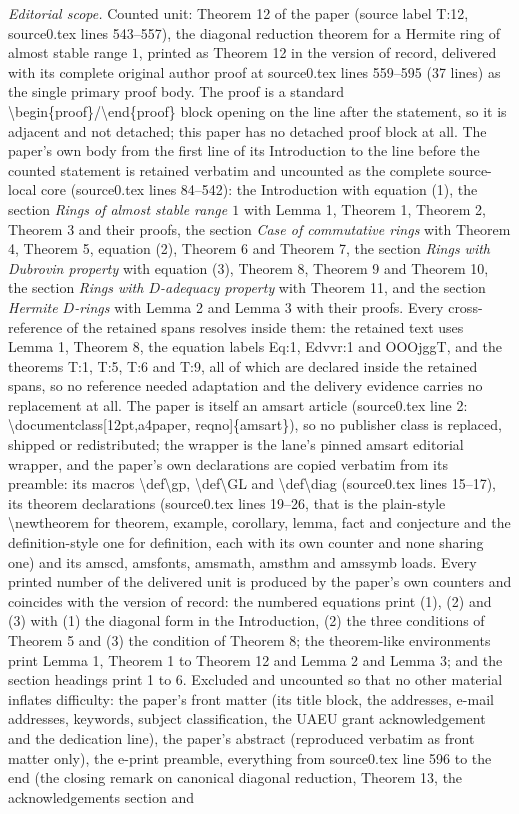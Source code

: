 \documentclass[10pt,a4paper]{amsart}
\theoremstyle{plain}
\theoremstyle{definition}
\begin{document}
\noindent\textit{Editorial scope.} Counted unit: Theorem 12 of the paper (source label T:12, source0.tex lines 543--557), the diagonal reduction theorem for a Hermite ring of almost stable range $1$, printed as Theorem 12 in the version of record, delivered with its complete original author proof at source0.tex lines 559--595 (37 lines) as the single primary proof body. The proof is a standard \textbackslash{}begin\{proof\}/\textbackslash{}end\{proof\} block opening on the line after the statement, so it is adjacent and not detached; this paper has no detached proof block at all. The paper's own body from the first line of its Introduction to the line before the counted statement is retained verbatim and uncounted as the complete source-local core (source0.tex lines 84--542): the Introduction with equation (1), the section \emph{Rings of almost stable range $1$} with Lemma 1, Theorem 1, Theorem 2, Theorem 3 and their proofs, the section \emph{Case of commutative rings} with Theorem 4, Theorem 5, equation (2), Theorem 6 and Theorem 7, the section \emph{Rings with Dubrovin property} with equation (3), Theorem 8, Theorem 9 and Theorem 10, the section \emph{Rings with $D$-adequacy property} with Theorem 11, and the section \emph{Hermite $D$-rings} with Lemma 2 and Lemma 3 with their proofs. Every cross-reference of the retained spans resolves inside them: the retained text uses Lemma 1, Theorem 8, the equation labels Eq:1, Edvvr:1 and OOOjggT, and the theorems T:1, T:5, T:6 and T:9, all of which are declared inside the retained spans, so no reference needed adaptation and the delivery evidence carries no replacement at all. The paper is itself an amsart article (source0.tex line 2: \textbackslash{}documentclass[12pt,a4paper, reqno]\{amsart\}), so no publisher class is replaced, shipped or redistributed; the wrapper is the lane's pinned amsart editorial wrapper, and the paper's own declarations are copied verbatim from its preamble: its macros \textbackslash{}def\textbackslash{}gp, \textbackslash{}def\textbackslash{}GL and \textbackslash{}def\textbackslash{}diag (source0.tex lines 15--17), its theorem declarations (source0.tex lines 19--26, that is the plain-style \textbackslash{}newtheorem for theorem, example, corollary, lemma, fact and conjecture and the definition-style one for definition, each with its own counter and none sharing one) and its amscd, amsfonts, amsmath, amsthm and amssymb loads. Every printed number of the delivered unit is produced by the paper's own counters and coincides with the version of record: the numbered equations print (1), (2) and (3) with (1) the diagonal form in the Introduction, (2) the three conditions of Theorem 5 and (3) the condition of Theorem 8; the theorem-like environments print Lemma 1, Theorem 1 to Theorem 12 and Lemma 2 and Lemma 3; and the section headings print 1 to 6. Excluded and uncounted so that no other material inflates difficulty: the paper's front matter (its title block, the addresses, e-mail addresses, keywords, subject classification, the UAEU grant acknowledgement and the dedication line), the paper's abstract (reproduced verbatim as front matter only), the e-print preamble, everything from source0.tex line 596 to the end (the closing remark on canonical diagonal reduction, Theorem 13, the acknowledgements section and 
\end{document}
